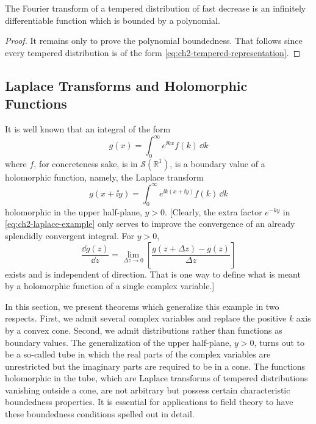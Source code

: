 \begin{theorem}[2-3]\label{thm:ch2-fourier-fast-decrease}
The Fourier transform of a tempered distribution of fast decrease is an
infinitely differentiable function which is bounded by a polynomial.
\end{theorem}

\begin{proof}
It remains only to prove the polynomial boundedness.  That follows since
every tempered distribution is of the form \eqref{eq:ch2-tempered-representation}.
\end{proof}

\subsection{Laplace Transforms and Holomorphic Functions}
\label{sec:ch2-laplace}

It is well known that an integral of the form
\begin{equation}
  g(x)=\int_0^\infty e^{\ii kx}f(k)\,\dd k
  \tag{2-53}\label{eq:ch2-one-sided-laplace}
\end{equation}
where $f$, for concreteness sake, is in $\mathcal{S}(\mathbb{R}^1)$, is a
boundary value of a holomorphic function, namely, the Laplace transform
\begin{equation}
  g(x+\ii y)=\int_0^\infty e^{\ii k(x+\ii y)}f(k)\,\dd k
  \tag{2-54}\label{eq:ch2-laplace-example}
\end{equation}
holomorphic in the upper half-plane, $y>0$.  [Clearly, the extra factor
$e^{-ky}$ in \eqref{eq:ch2-laplace-example} only serves to improve the convergence of an already
splendidly convergent integral.  For $y>0$,
\begin{equation*}
  \frac{\dd g(z)}{\dd z}=\lim_{\Delta z\to0}
    \left[\frac{g(z+\Delta z)-g(z)}{\Delta z}\right]
\end{equation*}
exists and is independent of direction.  That is one way to define what
is meant by a holomorphic function of a single complex variable.]

In this section, we present theorems which generalize this example in two
respects.  First, we admit several complex variables and replace the
positive $k$ axis by a convex cone.  Second, we admit distributions rather
than functions as boundary values.  The generalization of the upper
half-plane, $y>0$, turns out to be a so-called tube in which the real parts
of the complex variables are unrestricted but the imaginary parts are
required to be in a cone.  The functions holomorphic in the tube, which
are Laplace transforms of tempered distributions vanishing outside a cone,
are not arbitrary but possess certain characteristic boundedness
properties.  It is essential for applications to field theory to have
these boundedness conditions spelled out in detail.

